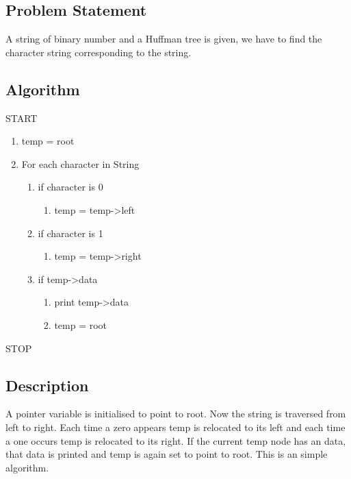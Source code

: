 \documentclass{article}
\begin{document}
\subsection{Problem Statement}
A string of binary number and a Huffman tree is given, we have to find the character string corresponding to the string.
\subsection{Algorithm}
START
\begin{flushleft}
\begin{enumerate}
    \item temp = root
    \item For each character in String
    \begin{flushleft}
    \begin{enumerate}
        \item if character is 0
        \begin{flushleft}
    \begin{enumerate}
    \item temp = temp->left
    
    \end{enumerate}
    \end{flushleft}
    \item if character is 1
    \begin{flushleft}
    \begin{enumerate}
    \item temp = temp->right
    \end{enumerate}
    \end{flushleft}
    
    \item if temp->data
    \begin{flushleft}
    \begin{enumerate}
    \item print temp->data
    \item temp = root
    \end{enumerate}
    \end{flushleft}
    \end{enumerate}
    \end{flushleft}
\end{enumerate}
\end{flushleft}
STOP
\subsection{Description}
A pointer variable is initialised to point to root. Now the string is traversed from left to right. Each time a zero appears temp is relocated to its left and each time a one occurs temp is relocated to its right. If the current temp node has an data, that data is printed and temp is again set to point to root. This is an simple algorithm.
\end{document}
